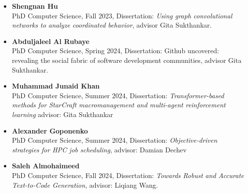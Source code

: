 \begin{itemize}
\item\textbf{Shengnan Hu} \\
PhD Computer Science, Fall 2023, Dissertation: {\em Using graph convolutional networks to analyze coordinated behavior}, advisor Gita Sukthankar.

\item\textbf{Abduljaleel Al Rubaye} \\
PhD Computer Science, Spring 2024, Dissertation: Github uncovered: revealing the social fabric of software development communities, advisor Gita Sukthankar.

\item\textbf{Muhammad Junaid Khan} \\
PhD Computer Science, Summer 2024, Dissertation: \emph{Transformer-based methods for StarCraft macromanagement and multi-agent reinforcement learning}
advisor: Gita Sukthankar 

\item\textbf{Alexander Goponenko} \\
PhD Computer Science, Summer 2024, Dissertation: \emph{Objective-driven strategies for HPC job scheduling}, advisor: Damian Dechev

\item\textbf{Saleh Almohaimeed} \\
PhD Computer Science, Fall 2024, Dissertation: \emph{Towards Robust and Accurate Text-to-Code Generation}, advisor: Liqiang Wang.


%
%







\end{itemize}
